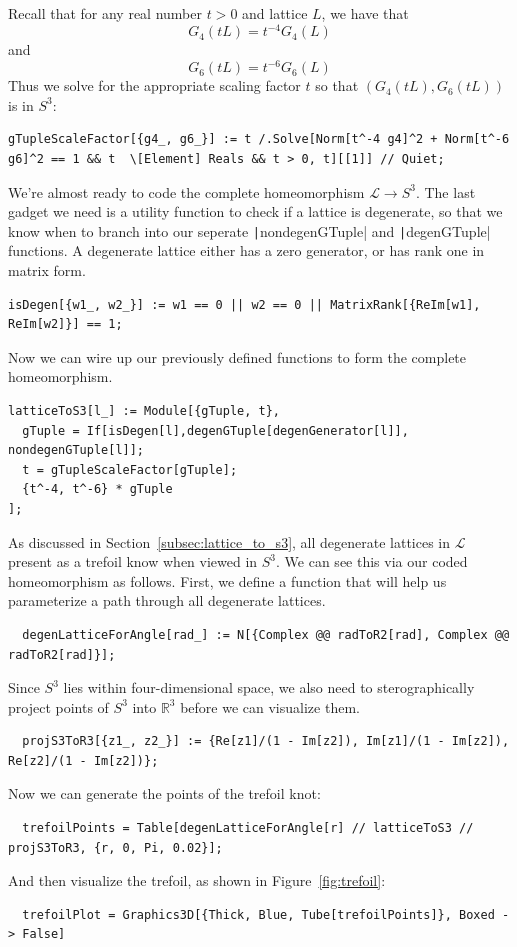 \documentclass[12pt,twoside]{reedthesis}
\theoremstyle{definition}
\newcommand{\R}{\mathbb{R}}
\newcommand{\LS}{\mathcal{L}}
\begin{document}
Recall that for any real number $t > 0$ and lattice $L$, we have that
\begin{equation*}
  G_4(tL) = t^{-4}G_4(L)
\end{equation*}
and
\begin{equation*}
  G_6(tL) = t^{-6} G_6(L)
\end{equation*}
Thus we solve for the appropriate scaling factor $t$ so that $(G_4(tL), G_6(tL))$ is in $S^3$:
\begin{verbatim}
gTupleScaleFactor[{g4_, g6_}] := t /.Solve[Norm[t^-4 g4]^2 + Norm[t^-6 g6]^2 == 1 && t  \[Element] Reals && t > 0, t][[1]] // Quiet;
\end{verbatim}

We're almost ready to code the complete homeomorphism $\LS \to S^3$.
The last gadget we need is a utility function to check if a lattice is degenerate, so that we know when to branch into our seperate \texttt|nondegenGTuple| and \texttt|degenGTuple| functions.
A degenerate lattice either has a zero generator, or has rank one in matrix form.
\begin{verbatim}
isDegen[{w1_, w2_}] := w1 == 0 || w2 == 0 || MatrixRank[{ReIm[w1], ReIm[w2]}] == 1;
\end{verbatim}
Now we can wire up our previously defined functions to form the complete homeomorphism.
\begin{verbatim}
latticeToS3[l_] := Module[{gTuple, t},
  gTuple = If[isDegen[l],degenGTuple[degenGenerator[l]], nondegenGTuple[l]]; 
  t = gTupleScaleFactor[gTuple];
  {t^-4, t^-6} * gTuple
];
\end{verbatim}
As discussed in Section~\ref{subsec:lattice_to_s3}, all degenerate lattices in $\LS$ present as a trefoil know when viewed in $S^3$.
We can see this via our coded homeomorphism as follows.
First, we define a function that will help us parameterize a path through all degenerate lattices.
\begin{verbatim}
  degenLatticeForAngle[rad_] := N[{Complex @@ radToR2[rad], Complex @@ radToR2[rad]}];
\end{verbatim}
Since $S^3$ lies within four-dimensional space, we also need to sterographically project points of $S^3$ into $\R^3$ before we can visualize them.
\begin{verbatim}
  projS3ToR3[{z1_, z2_}] := {Re[z1]/(1 - Im[z2]), Im[z1]/(1 - Im[z2]), Re[z2]/(1 - Im[z2])};
\end{verbatim}
Now we can generate the points of the trefoil knot:
\begin{verbatim}
  trefoilPoints = Table[degenLatticeForAngle[r] // latticeToS3 // projS3ToR3, {r, 0, Pi, 0.02}];
\end{verbatim}
And then visualize the trefoil, as shown in Figure~\ref{fig:trefoil}:
\begin{verbatim}
  trefoilPlot = Graphics3D[{Thick, Blue, Tube[trefoilPoints]}, Boxed -> False]
\end{verbatim}
\end{document}
